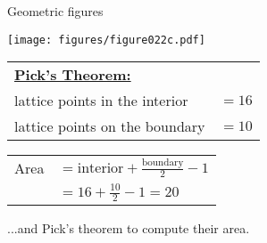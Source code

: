 \documentclass[14pt]{beamer}
\begin{document}
    \begin{frame}{Geometric figures}
        \begin{center}
            \begin{minipage}{0.5\textwidth}%
                \centering \texttt{[image: figures/figure022c.pdf]}
            \end{minipage}\hfill\begin{minipage}{0.49\textwidth} \footnotesize
                \begin{tabular}{ll}
                    \multicolumn{2}{l}{\small \textbf{\href{https://en.wikipedia.org/wiki/Pick\%27s_theorem}{Pick's Theorem:}}} \\[4ex]
                    lattice points in the interior & $\!\!\!\!\! = 16$  \\[2ex]
                    lattice points on the boundary & $\!\!\!\!\! = 10$  \\
                \end{tabular}

                \bigskip \medskip

                \begin{tabular}{ll}
                    Area & $\!\!\!\!\!= \text{interior} + \frac{\text{boundary}}{2} - 1$ \\[2ex]
                         & $\!\!\!\!\!= 16 + \frac{10}{2} - 1 = 20$
                \end{tabular}

            \end{minipage}

            \bigskip \bigskip

            ...and Pick's theorem to compute their area.\\\phantom{pfht}
        \end{center}
    \end{frame}

\end{document}
